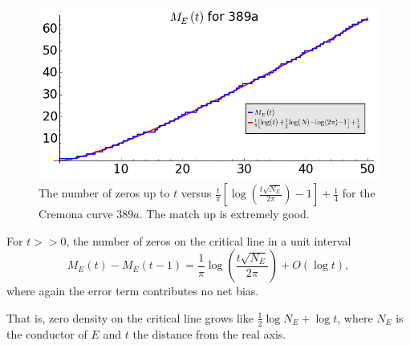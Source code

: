 \begin{figure}[!h]
    \centering
    \includegraphics[width=1.0\textwidth]{graphics/M_E_389.png}
    \caption{The number of zeros up to $t$ versus $\frac{t}{\pi}\left[\log\left(\frac{t\sqrt{N_E}}{2\pi}\right) -1 \right] + \frac{1}{4}$ for the Cremona curve $389a$. The match up is extremely good.}
    \label{fig:M_E_389}
\end{figure}

\begin{corollary}
For $t>>0$, the number of zeros on the critical line in a unit interval
\begin{equation}
M_E(t)-M_E(t-1) = \frac{1}{\pi}\log\left(\frac{t\sqrt{N_E}}{2\pi}\right) + O(\log t),
\end{equation}
where again the error term contributes no net bias.
\end{corollary}

That is, zero density on the critical line grows like $\frac{1}{2}\log N_E + \log t$, where $N_E$ is the conductor of $E$ and $t$ the distance from the real axis. \\

